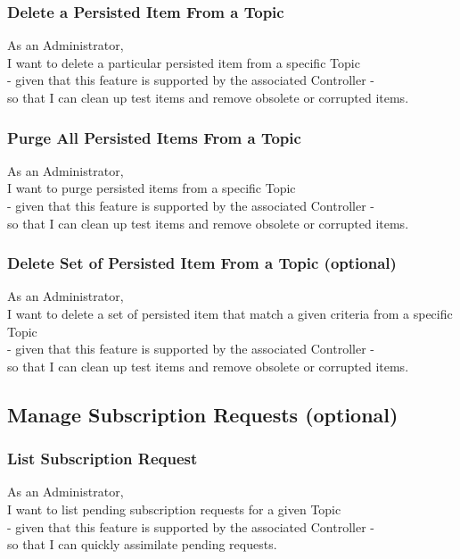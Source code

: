 \subsubsection{Delete a Persisted Item From a Topic}

As an Administrator,\\
I want to delete a particular persisted item from a specific Topic\\
- given that this feature is supported by the associated Controller -\\
so that I can clean up test items and remove obsolete or corrupted items.

\subsubsection{Purge All Persisted Items From a Topic}

As an Administrator,\\
I want to purge persisted items from a specific Topic\\
- given that this feature is supported by the associated Controller -\\
so that I can clean up test items and remove obsolete or corrupted items.

\subsubsection{Delete Set of Persisted Item From a Topic (optional)}

As an Administrator,\\
I want to delete a set of persisted item that match a given criteria from a specific Topic\\
- given that this feature is supported by the associated Controller -\\
so that I can clean up test items and remove obsolete or corrupted items.

\subsection{Manage Subscription Requests (optional)}\label{sec:subscription-requests}

\subsubsection{List Subscription Request}
As an Administrator,\\
I want to list pending subscription requests for a given Topic\\
- given that this feature is supported by the associated Controller -\\
so that I can quickly assimilate pending requests.

